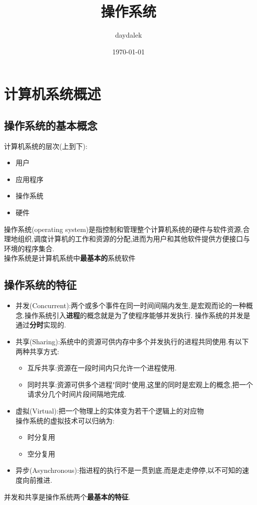 \documentclass{ctexart}
\begin{document}
\title{操作系统}
\author{daydalek}
\date{\today}
\maketitle

\section{计算机系统概述}
\subsection{操作系统的基本概念}
计算机系统的层次(上到下):
\begin{itemize}
\item 用户
\item 应用程序
\item 操作系统
\item 硬件
\end {itemize}
操作系统(operating system)是指控制和管理整个计算机系统的硬件与软件资源,合理地组织,调度计算机的工作和资源的分配,进而为用户和其他软件提供方便接口与环境的程序集合.\\
操作系统是计算机系统中\textbf{最基本的}系统软件
\subsection{操作系统的特征}
\begin{itemize}
	\item 并发(Concurrent):两个或多个事件在同一时间间隔内发生,是宏观而论的一种概念.操作系统引入\textbf{进程}的概念就是为了使程序能够并发执行.
	      操作系统的并发是通过\textbf{分时}实现的.
	\item 共享(Sharing):系统中的资源可供内存中多个并发执行的进程共同使用.有以下两种共享方式:\\
	      \begin{itemize}
		      \item 互斥共享:资源在一段时间内只允许一个进程使用.
		      \item 同时共享:资源可供多个进程"同时"使用,这里的同时是宏观上的概念,把一个请求分几个时间片段间隔地完成.
	      \end{itemize}
	\item 虚拟(Virtual):把一个物理上的实体变为若干个逻辑上的对应物\\
	      操作系统的虚拟技术可以归纳为:
	      \begin{itemize}
		      \item 时分复用
		      \item 空分复用
	      \end{itemize}
	\item 异步(Asynchronous):指进程的执行不是一贯到底,而是走走停停,以不可知的速度向前推进.
\end{itemize}
并发和共享是操作系统两个\textbf{最基本的特征}.
\end{document}
